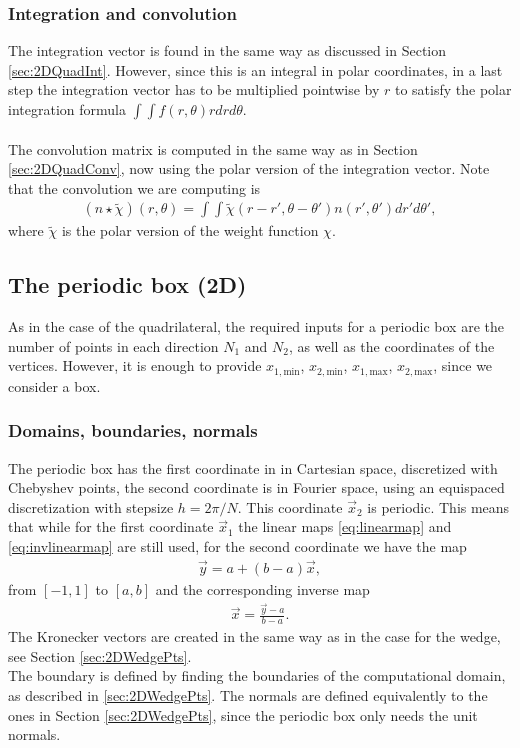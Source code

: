 \subsubsection{Integration and convolution}
The integration vector is found in the same way as discussed in Section \ref{sec:2DQuadInt}. However, since this is an integral in polar coordinates, in a last step the integration vector has to be multiplied pointwise by $r$ to satisfy the polar integration formula $\int \int f(r, \theta) r dr d\theta$.
\\
\\
The convolution matrix is computed in the same way as in Section \ref{sec:2DQuadConv}, now using the polar version of the integration vector. 
Note that the convolution we are computing is
\begin{align*}
	\left(n \star \tilde \chi \right) (r, \theta) = \int \int \tilde \chi (r - r', \theta - \theta') n (r',\theta') d r' d\theta',
\end{align*}
where $\tilde \chi$ is the polar version of the weight function $\chi$.
\subsection{The periodic box (2D)}
As in the case of the quadrilateral, the required inputs for a periodic box are the number of points in each direction $N_1$ and $N_2$, as well as the coordinates of the vertices. However, it is enough to provide $x_{1,\text{min}}$, $x_{2,\text{min}}$, $x_{1,\text{max}}$, $x_{2,\text{max}}$, since we consider a box.

\subsubsection{Domains, boundaries, normals}
The periodic box has the first coordinate in in Cartesian space, discretized with Chebyshev points, the second coordinate is in Fourier space, using an equispaced discretization with stepsize $h = 2\pi /N$. This coordinate $\vec x_2$ is periodic. 
This means that while for the first coordinate $\vec x_1$ the linear maps \eqref{eq:linearmap} and \eqref{eq:invlinearmap} are still used, for the second coordinate we have the map 
\begin{align*}
	\vec y = a + (b-a) \vec x, 
\end{align*}
from $[-1,1]$ to $[a,b]$ and the corresponding inverse map
\begin{align*}
   \vec x = \frac{\vec y- a}{b-a}.
\end{align*}
The Kronecker vectors are created in the same way as in the case for the wedge, see Section \ref{sec:2DWedgePts}.
\\
The boundary is defined by finding the boundaries of the computational domain, as described in \ref{sec:2DWedgePts}. The normals are defined equivalently to the ones in Section \ref{sec:2DWedgePts}, since the periodic box only needs the unit normals.

